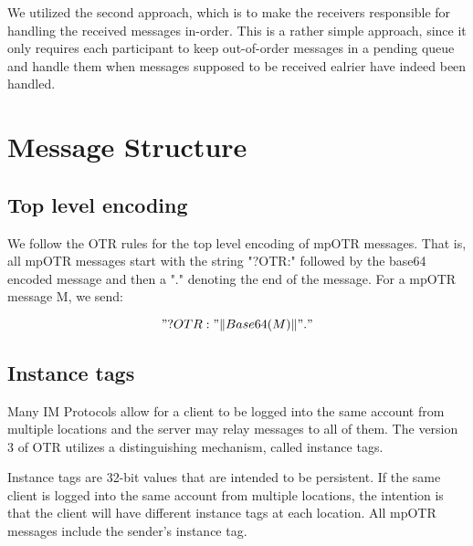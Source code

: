 We utilized the second approach, which is to make the receivers responsible for handling the received messages in-order. This is a rather simple approach, since it only requires each participant to keep out-of-order messages in a pending queue and handle them when messages supposed to be received ealrier have indeed been handled.



\section{Message Structure}

\subsection{Top level encoding}
We follow the OTR rules for the top level encoding of mpOTR messages. That is, all mpOTR messages start with the string "?OTR:" followed by the base64 encoded message and then a "." denoting the end of the message. For a mpOTR message M, we send:

\[ 
  "?OTR:" \Vert Base64(M) \Vert "."
\]

\subsection{Instance tags}
\label{subsections:instance_tags}
Many IM Protocols allow for a client to be logged into the same account from multiple locations and the server may relay messages to all of them. The version 3 of OTR utilizes a distinguishing mechanism, called instance tags.

Instance tags are 32-bit values that are intended to be persistent. If the same client is logged into the same account from multiple locations, the intention is that the client will have different instance tags at each location. All mpOTR messages include the sender's instance tag.

